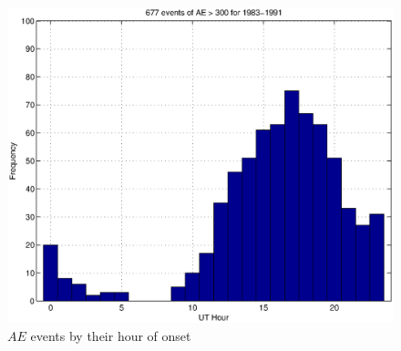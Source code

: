\documentclass[10pt,twocolumn]{article}
\begin{document}
\begin{figure}[htp!]
\includegraphics[scale=0.45]{paperfigures/AEbyhour.eps}
\caption{$AE$ events by their hour of onset}
\end{figure}
\clearpage
\end{document}

